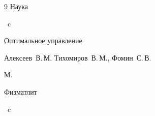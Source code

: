 \begin{thebibliography}{9}
\publ Наука


~c






\book Оптимальное управление

\by Алексеев~В.\,М. Тихомиров~В.\,М., Фомин~С.\,В.

\publaddr М.

\publ Физматлит


~c







\end{thebibliography}



\vspace{-5mm}





\makeengtitle





%

